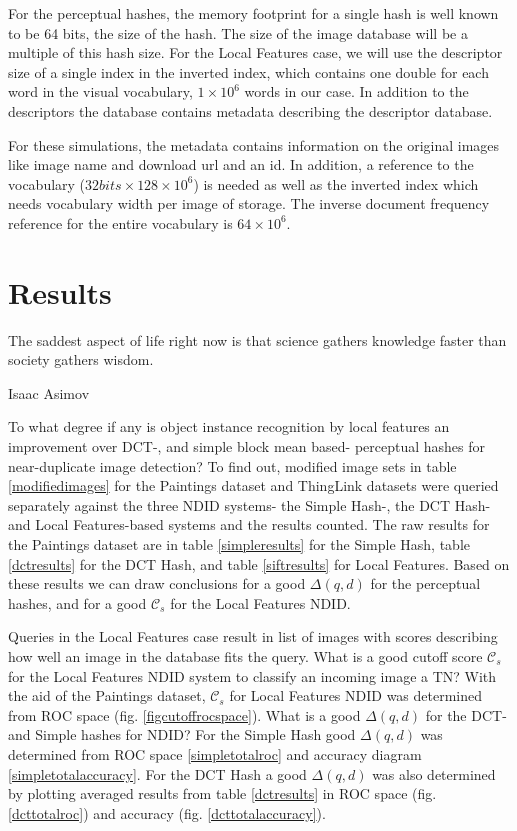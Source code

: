 \documentclass[english,12pt,a4paper,pdftex,elec,utf8, table]{aaltothesis}
\begin{document}
For the perceptual hashes, the memory footprint for a single hash is well known to be 64 bits, the size of the hash. The size of the image database will be a multiple of this hash size. For the Local Features case, we will use the descriptor size of a single index in the inverted index, which contains one double for each word in the visual vocabulary, $1\times10^6$ words in our case. In addition to the descriptors the database contains metadata describing the descriptor database.

For these simulations, the metadata contains information on the original images like image name and download url and an id. In addition, a reference to the vocabulary ($32 bits \times 128 \times 10^6$) is needed as well as the inverted index which needs vocabulary width per image of storage. The inverse document frequency reference for the entire vocabulary is $64 \times 10^6$.
\clearpage

\section{Results}
\epigraph{The saddest aspect of life right now is that science gathers knowledge faster than society gathers wisdom.}{Isaac Asimov}
To what degree if any is object instance recognition by local features an improvement over DCT-, and simple block mean based- perceptual hashes for near-duplicate image detection? To find out, modified image sets in table \ref{modifiedimages} for the Paintings dataset and ThingLink datasets were queried separately against the three NDID systems- the Simple Hash-, the DCT Hash- and Local Features-based systems and the results counted. The raw results for the Paintings dataset are in table \ref{simpleresults} for the Simple Hash, table \ref{dctresults} for the DCT Hash, and table \ref{siftresults} for Local Features. Based on these results we can draw conclusions for a good $\Delta(q,d)$ for the perceptual hashes, and for a good $\mathcal{C}_s$ for the Local Features NDID.

Queries in the Local Features case result in list of images with scores describing how well an image in the database fits the query. What is a good cutoff score $\mathcal{C}_s$ for the Local Features NDID system to classify an incoming image a TN? With the aid of the Paintings dataset, $\mathcal{C}_s$ for Local Features NDID was determined from ROC space (fig. \ref{figcutoffrocspace}). What is a good $\Delta(q,d)$ for the DCT- and Simple hashes for NDID? For the Simple Hash good $\Delta(q,d)$ was determined from ROC space \ref{simpletotalroc} and accuracy diagram \ref{simpletotalaccuracy}. For the DCT Hash a good $\Delta(q,d)$ was also determined by plotting averaged results from table \ref{dctresults} in ROC space (fig. \ref{dcttotalroc}) and accuracy (fig. \ref{dcttotalaccuracy}).
\end{document}
